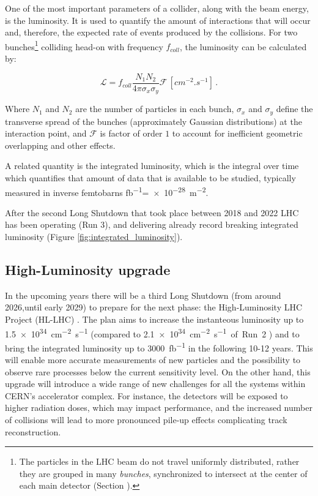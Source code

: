 One of the most important parameters of a collider, along with the beam energy, is the luminosity. It is used to quantify the amount of interactions that will occur and, therefore, the expected rate of events produced by the collisions. For two bunches\footnote{\label{footnote:particle_beam_bunches} The particles in the LHC beam do not travel uniformly distributed, rather they are grouped in many \textit{bunches}, synchronized to intersect at the center of each main detector (Section ).} colliding head-on with frequency $f_{coll}$, the luminosity can be calculated by:

\begin{equation}
    \mathcal{L} = f_{coll}\frac{N_1 N_2}{4\pi \sigma_x \sigma_y} \mathcal{F} \, \left[\unit{cm^{-2}.s^{-1}}\right] \, .
\end{equation}

Where $N_1$ and $N_2$ are the number of particles in each bunch, $\sigma_x$ and $\sigma_y$ define the transverse spread of the bunches (approximately Gaussian distributions) at the interaction point, and $\mathcal{F}$ is factor of order $1$ to account for inefficient geometric overlapping and other effects.

A related quantity is the integrated luminosity, which is the integral over time which quantifies that amount of data that is available to be studied, typically measured in inverse femtobarns \unit{\femto\barn^{-1}}=\qty{e-28}{\meter^{-2}}.

After the second Long Shutdown that took place between 2018 and 2022 LHC has been operating (Run 3), and delivering already record breaking integrated luminosity (Figure \ref{fig:integrated_luminosity}).

\subsection{High-Luminosity upgrade}\label{subsec:high_luminosity_upgrade}
In the upcoming years there will be a third Long Shutdown (from around 2026,until early 2029) to prepare for the next phase: the High-Luminosity LHC Project (HL-LHC) \cite{cernHLLHCProject}. The plan aims to increase the instanteous luminosity up to \qty{1.5e34}{\centi\meter^{-2}\second^{-1}} (compared to \qty{2.1e34}{\centi\meter^{-2}\second^{-1} of Run 2} \cite{CERN-LHCC-2020-007}) and to bring the integrated luminosity up to \qty{3000}{\femto\barn^{-1}} in the following 10-12 years. This will enable more accurate measurements of new particles and the possibility to observe rare processes below the current sensitivity level. On the other hand, this upgrade will introduce a wide range of new challenges for all the systems within CERN's accelerator complex. For instance, the detectors will be exposed to higher radiation doses, which may impact performance, and the increased number of collisions will lead to more pronounced pile-up effects complicating track reconstruction.

